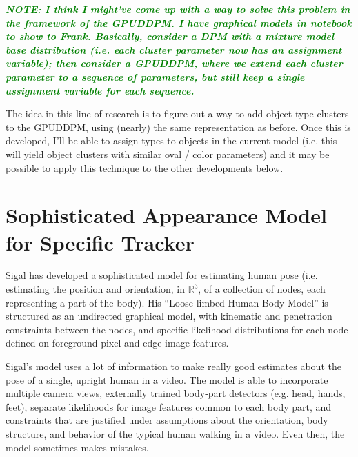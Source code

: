 \documentclass{article}
\newcommand{\willie}[1]{\textcolor{green}{\textsf{\emph{\textbf{\textcolor{green}{#1}}}}}}
\begin{document}
\willie{NOTE: I think I might've come up with a way to solve this problem in the framework of the GPUDDPM. I have graphical models in notebook to show to Frank. Basically, consider a DPM with a mixture model base distribution (i.e. each cluster parameter now has an assignment variable); then consider a GPUDDPM, where we extend each cluster parameter to a sequence of parameters, but still keep a single assignment variable for each sequence.}

The idea in this line of research is to figure out a way to add object type clusters to the GPUDDPM, using (nearly) the same representation as before. Once this is developed, I'll be able to assign types to objects in the current model (i.e. this will yield object clusters with similar oval / color parameters) and it may be possible to apply this technique to the other developments below.



\section{Sophisticated Appearance Model for Specific Tracker}

Sigal has developed a sophisticated model for estimating human pose (i.e. estimating the position and orientation, in $\mathbb{R}^{3}$, of a collection of nodes, each representing a part of the body). His ``Loose-limbed Human Body Model'' is structured as an undirected graphical model, with kinematic and penetration constraints between the nodes, and specific likelihood distributions for each node defined on foreground pixel and edge image features.

Sigal's model uses a lot of information to make really good estimates about the pose of a single, upright human in a video. The model is able to incorporate multiple camera views, externally trained body-part detectors (e.g. head, hands, feet), separate likelihoods for image features common to each body part, and constraints that are justified under assumptions about the orientation, body structure, and behavior of the typical human walking in a video. Even then, the model sometimes makes mistakes.
\end{document}
